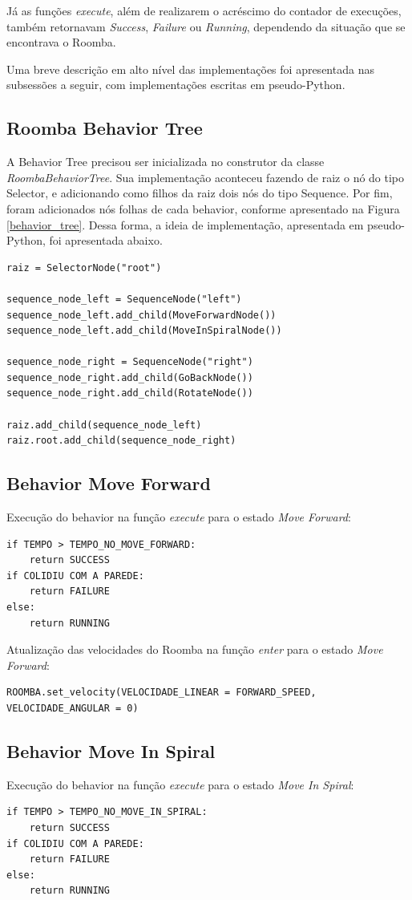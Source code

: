 \documentclass[conference]{IEEEtran}
\begin{document}
Já as funções \textit{execute}, além de realizarem o acréscimo do contador de execuções, também retornavam \textit{Success}, \textit{Failure} ou \textit{Running}, dependendo da situação que se encontrava o Roomba.

Uma breve descrição em alto nível das implementações foi apresentada nas subsessões a seguir, com implementações escritas em pseudo-Python.

\subsection{Roomba Behavior Tree}
A Behavior Tree precisou ser inicializada no construtor da classe \textit{RoombaBehaviorTree}. Sua implementação aconteceu fazendo de raiz o nó do tipo Selector, e adicionando como filhos da raiz dois nós do tipo Sequence. Por fim, foram adicionados nós folhas de cada behavior, conforme apresentado na Figura \ref{behavior_tree}. Dessa forma, a ideia de implementação, apresentada em pseudo-Python, foi apresentada abaixo.
\begin{lstlisting}
raiz = SelectorNode("root")

sequence_node_left = SequenceNode("left")
sequence_node_left.add_child(MoveForwardNode())
sequence_node_left.add_child(MoveInSpiralNode())

sequence_node_right = SequenceNode("right")
sequence_node_right.add_child(GoBackNode())
sequence_node_right.add_child(RotateNode())

raiz.add_child(sequence_node_left)
raiz.root.add_child(sequence_node_right)
\end{lstlisting}

\subsection{Behavior Move Forward}
Execução do behavior na função \textit{execute} para o estado \textit{Move Forward}:
\begin{lstlisting}
if TEMPO > TEMPO_NO_MOVE_FORWARD:
	return SUCCESS
if COLIDIU COM A PAREDE:
	return FAILURE
else:
	return RUNNING
\end{lstlisting}

Atualização das velocidades do Roomba na função \textit{enter} para o estado \textit{Move Forward}:
\begin{lstlisting}
ROOMBA.set_velocity(VELOCIDADE_LINEAR = FORWARD_SPEED, VELOCIDADE_ANGULAR = 0)
\end{lstlisting}

\subsection{Behavior Move In Spiral}
Execução do behavior na função \textit{execute} para o estado \textit{Move In Spiral}:
\begin{lstlisting}
if TEMPO > TEMPO_NO_MOVE_IN_SPIRAL:
	return SUCCESS
if COLIDIU COM A PAREDE:
	return FAILURE
else:
	return RUNNING
\end{lstlisting}
\end{document}
